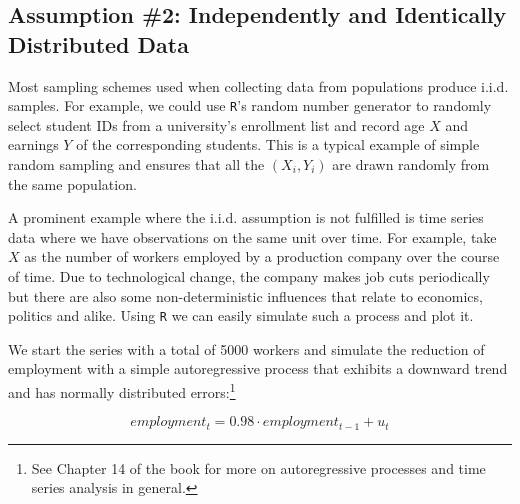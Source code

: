 \documentclass[]{book}
\let\rmarkdownfootnote\footnote%
\def\footnote{\protect\rmarkdownfootnote}
\theoremstyle{definition}
\theoremstyle{definition}
\theoremstyle{definition}
\theoremstyle{remark}
\begin{document}
\subsection*{Assumption \#2: Independently and Identically Distributed
Data}\label{assumption-2-independently-and-identically-distributed-data}

Most sampling schemes used when collecting data from populations produce
i.i.d. samples. For example, we could use \texttt{R}'s random number
generator to randomly select student IDs from a university's enrollment
list and record age \(X\) and earnings \(Y\) of the corresponding
students. This is a typical example of simple random sampling and
ensures that all the \((X_i, Y_i)\) are drawn randomly from the same
population.

A prominent example where the i.i.d. assumption is not fulfilled is time
series data where we have observations on the same unit over time. For
example, take \(X\) as the number of workers employed by a production
company over the course of time. Due to technological change, the
company makes job cuts periodically but there are also some
non-deterministic influences that relate to economics, politics and
alike. Using \texttt{R} we can easily simulate such a process and plot
it.

We start the series with a total of 5000 workers and simulate the
reduction of employment with a simple autoregressive process that
exhibits a downward trend and has normally distributed errors:\footnote{See
  Chapter 14 of the book for more on autoregressive processes and time
  series analysis in general.}

\[ employment_t = 0.98 \cdot employment_{t-1} + u_t \]
\end{document}
